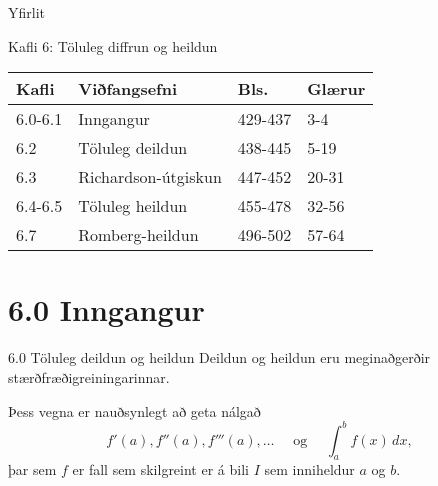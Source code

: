 \date{21., 26.~og 28.~febrúar, 5., og 7.~mars, 2014}



\begin{frame}
	\maketitle
\end{frame}

\begin{frame}{Yfirlit}
\begin{block}{Kafli 6: Töluleg diffrun og heildun}
\begin{center}
\begin{tabular}{|l|l|l|l|}\hline
  Kafli & Viðfangsefni & Bls. & Glærur\\
  \hline
  6.0-6.1 &Inngangur		& 429-437 & 3-4\\
  6.2 &Töluleg deildun		& 438-445 & 5-19\\
  6.3 &Richardson-útgiskun	& 447-452 & 20-31\\
  6.4-6.5 &Töluleg heildun	& 455-478 & 32-56\\
  6.7 &Romberg-heildun		& 496-502 & 57-64\\
\hline
\end{tabular}
\end{center}
\end{block}
\end{frame}


\section*{6.0 Inngangur}

\begin{frame}{6.0 Töluleg deildun og heildun  }  
Deildun og heildun eru meginaðgerðir stærðfræðigreiningarinnar.

Þess vegna er nauðsynlegt að geta nálgað
\begin{equation*}
  f'(a),f''(a),f'''(a),\dots \quad 
  \text{ og } \quad
  \int_a^b f(x)\, dx,
\end{equation*}
þar sem $f$ er fall sem skilgreint er á bili $I$ sem inniheldur $a$ og $b$.  
\end{frame}



